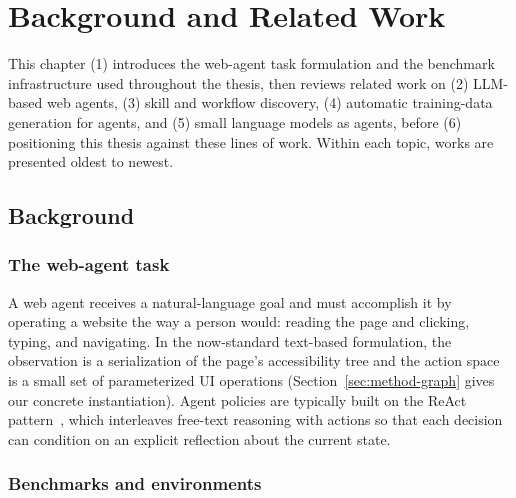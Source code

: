 \chapter{Background and Related Work}
\label{ch:related}

This chapter (1) introduces the web-agent task formulation and the benchmark
infrastructure used throughout the thesis, then reviews related work on
(2) LLM-based web agents, (3) skill and workflow discovery, (4) automatic
training-data generation for agents, and (5) small language models as agents,
before (6) positioning this thesis against these lines of work. Within each
topic, works are presented oldest to newest.

\section{Background}
\label{sec:rel-background}

\subsection{The web-agent task}

A web agent receives a natural-language goal and must accomplish it by
operating a website the way a person would: reading the page and clicking,
typing, and navigating. In the now-standard text-based formulation, the
observation is a serialization of the page's accessibility tree and the
action space is a small set of parameterized UI operations
(Section~\ref{sec:method-graph} gives our concrete instantiation). Agent
policies are typically built on the ReAct pattern~\cite{yao2023react}, which
interleaves free-text reasoning with actions so that each decision can
condition on an explicit reflection about the current state.

\subsection{Benchmarks and environments}

